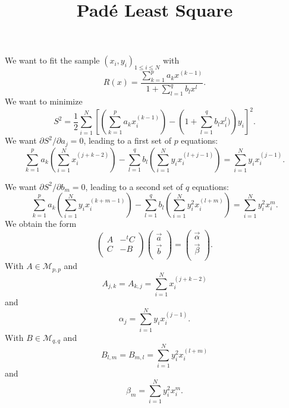 \documentclass[aps,twocolumn]{revtex4}
\begin{document}
\title{Padé Least Square}
We want to fit the sample $(x_i,y_i)_{1\leq i \leq N}$
with
$$
	R(x) = \dfrac{\displaystyle\sum_{k=1}^p a_k x^{(k-1)}}{\displaystyle 1+\sum_{l=1}^q b_l x^{l}}.
$$
We want to minimize
$$
	S^2 = \dfrac{1}{2}\sum_{i=1}^N \left[ \left(\sum_{k=1}^p a_k x_i^{(k-1)}\right) - \left(1+\sum_{l=1}^{q} b_l x_i^l)\right)y_i  \right]^2.
$$
We want	$\partial S^2/\partial a_j=0$, leading to a first set of $p$ equations:
$$
	\sum_{k=1}^{p} a_k \left(\sum_{i=1}^{N}x_i^{(j+k-2)}\right) - 
	\sum_{l=1}^{q} b_l \left(\sum_{i=1}^N y_i x_i^{(l+j-1)} \right) = \sum_{i=1}^N y_i x_i^{(j-1)}.
$$

We want $\partial S^2/\partial b_m=0$, leading to a second set of $q$ equations:
$$
	\sum_{k=1}^p a_k \left(\sum_{i=1}^N y_ix_i^{(k+m-1)}\right) - 
	\sum_{l=1}^q b_l \left(\sum_{i=1}^N y_i^2 x_i^{(l+m)}\right) = \sum_{i=1}^N y_i^2 x_i^{m}.
$$
We obtain the form
$$
	\begin{pmatrix}
	A & -\!\!^tC\\
	 C & -B\\
	\end{pmatrix}
	\begin{pmatrix}
	\vec{a} \\
	\vec{b} \\
	\end{pmatrix}
	=
	\begin{pmatrix}
	\vec{\alpha}\\
	\vec{\beta} \\
	\end{pmatrix}.
$$
With $A\in\mathcal{M}_{p,p}$ and
$$
	A_{j,k} = A_{k,j} = \sum_{i=1}^N x_i^{(j+k-2)}
$$
and
$$
	\alpha_j = \sum_{i=1}^N y_ix_i^{(j-1)}.
$$
With $B\in\mathcal{M}_{q,q}$ and
$$
	B_{l,m} = B_{m,l} = \sum_{i=1}^N y_i^2x_i^{(l+m)}
$$
and
$$
	\beta_m = \sum_{i=1}^N y_i^2 x_i^{m}.
$$
\end{document}
